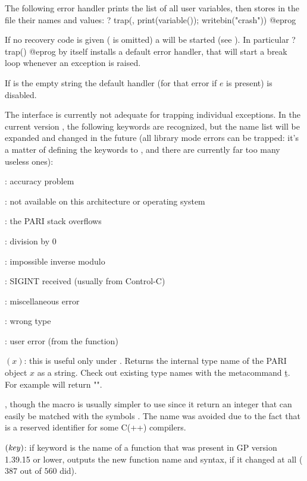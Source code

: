 The following error handler prints the list of all user variables, then
stores in the file  their names and values:
\bprog
? trap(, print(variable()); writebin("crash"))
@eprog

If no recovery code is given ( is omitted) a  will
be started (see ). In particular
\bprog
? trap()
@eprog\noindent
by itself installs a default error handler, that will start a break
loop whenever an exception is raised.

If  is the empty string  the default handler (for that error
if $e$ is present) is disabled.

 The interface is currently not adequate for trapping
individual exceptions. In the current version \vers, the following keywords
are recognized, but the name list will be expanded and changed in the
future (all library mode errors can be trapped: it's a matter of defining
the keywords to , and there are currently far too many useless ones):

: accuracy problem

: not available on this architecture or operating system

: the PARI stack overflows

: division by 0

: impossible inverse modulo

: SIGINT received (usually from Control-C)

: miscellaneous error

: wrong type

: user error (from the  function)

$(x)$: this is useful only under . Returns the
internal type name of the PARI object $x$ as a  string. Check out
existing type names with the metacommand \b{t}.\label{se:gptype}
For example  will return "".

, though the macro  is usually simpler to use
since it return an integer that can easily be matched with the symbols \typ{*}.
The name  was avoided due to the fact that  is a reserved identifier for some C(++) compilers.

$(\hbox{\it key\/})$: if keyword  is the name
of a function that was present in GP version 1.39.15 or lower, outputs
the new function name and syntax, if it changed at all ($387$ out of $560$
did).\label{se:whatnow}

